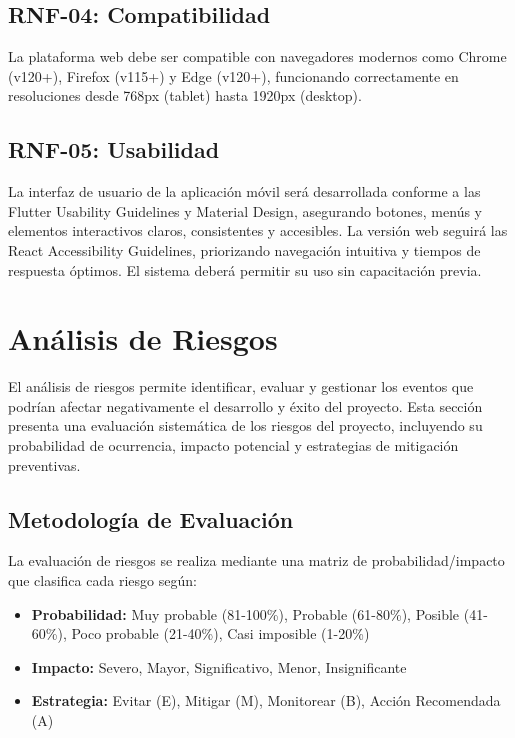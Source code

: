 \subsection{RNF-04: Compatibilidad}
La plataforma web debe ser compatible con navegadores modernos como Chrome (v120+), Firefox (v115+) y Edge (v120+), funcionando correctamente en resoluciones desde 768px (tablet) hasta 1920px (desktop).

\subsection{RNF-05: Usabilidad}
La interfaz de usuario de la aplicación móvil será desarrollada conforme a las Flutter Usability Guidelines y Material Design, asegurando botones, menús y elementos interactivos claros, consistentes y accesibles. La versión web seguirá las React Accessibility Guidelines, priorizando navegación intuitiva y tiempos de respuesta óptimos. El sistema deberá permitir su uso sin capacitación previa.

\section{Análisis de Riesgos}

El análisis de riesgos permite identificar, evaluar y gestionar los eventos que podrían afectar negativamente el desarrollo y éxito del proyecto. Esta sección presenta una evaluación sistemática de los riesgos del proyecto, incluyendo su probabilidad de ocurrencia, impacto potencial y estrategias de mitigación preventivas.

\subsection{Metodología de Evaluación}

La evaluación de riesgos se realiza mediante una matriz de probabilidad/impacto que clasifica cada riesgo según:

\begin{itemize}
    \item \textbf{Probabilidad:} Muy probable (81-100\%), Probable (61-80\%), Posible (41-60\%), Poco probable (21-40\%), Casi imposible (1-20\%)
    \item \textbf{Impacto:} Severo, Mayor, Significativo, Menor, Insignificante
    \item \textbf{Estrategia:} Evitar (E), Mitigar (M), Monitorear (B), Acción Recomendada (A)
\end{itemize}

